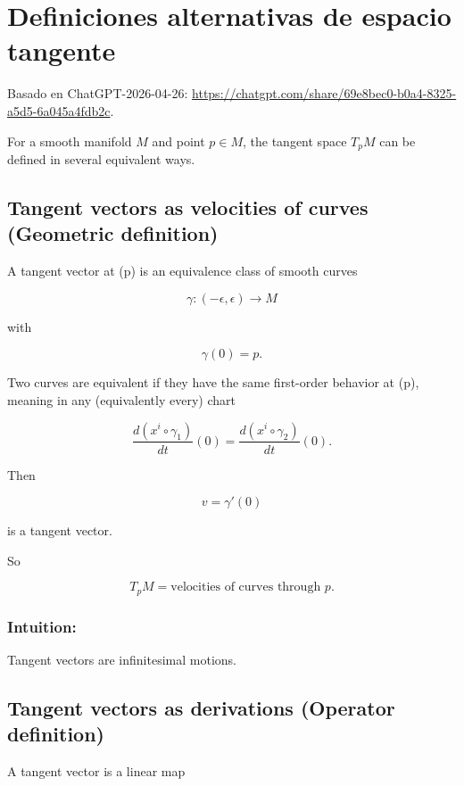 \documentclass[aps,prl,twocolumn,groupedaddress]{revtex4-2}
\begin{document}


\appendix

\section{Definiciones alternativas de espacio tangente}

Basado en ChatGPT-2026-04-26:
\url{https://chatgpt.com/share/69e8bec0-b0a4-8325-a5d5-6a045a4fdb2c}.

For a smooth manifold $M$ and point $p\in M$, the tangent space $T_pM$ can be defined in several equivalent ways.

\subsection{Tangent vectors as velocities of curves (Geometric definition)}

A tangent vector at (p) is an equivalence class of smooth curves

$$
\gamma:(-\epsilon,\epsilon)\to M
$$

with

$$
\gamma(0)=p.
$$

Two curves are equivalent if they have the same first-order behavior at (p), meaning in any (equivalently every) chart

$$
\frac{d(x^i\circ \gamma_1)}{dt}(0)
=
\frac{d(x^i\circ \gamma_2)}{dt}(0).
$$

Then

$$
v=\gamma'(0)
$$

is a tangent vector.

So

$$
T_pM
=
{\text{velocities of curves through }p}.
$$

\subsubsection{Intuition:}

Tangent vectors are infinitesimal motions.

\subsection{Tangent vectors as derivations (Operator definition)}

A tangent vector is a linear map
\end{document}
